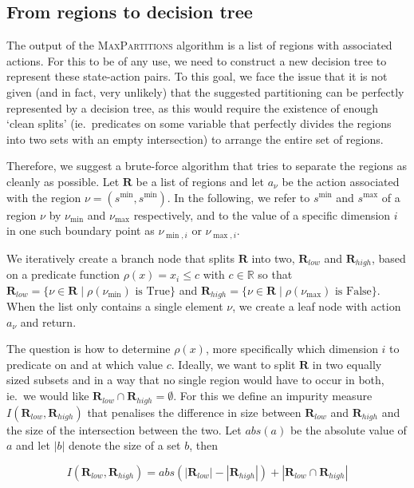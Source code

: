 \subsection{From regions to decision tree}%
\label{sub:regionsToDT}

The output of the \textsc{MaxPartitions} algorithm is a list of regions with
associated actions. For this to be of any use, we need to construct a new
decision tree to represent these state-action pairs. To this goal, we face the
issue that it is not given (and in fact, very unlikely) that the suggested
partitioning can be perfectly represented by a decision tree, as this would
require the existence of enough `clean splits' (ie.\ predicates on some variable
that perfectly divides the regions into two sets with an empty intersection) to
arrange the entire set of regions.

Therefore, we suggest a brute-force algorithm that tries to separate the regions
as cleanly as possible. Let $\mathbf{R}$ be a list of regions and let $a_{\nu}$
be the action associated with the region $\nu = (s^{\min}, s^{\min})$. In the
following, we refer to $s^{\min}$ and $s^{\max}$ of a region $\nu$ by
$\nu_{\min}$ and $\nu_{\max}$ respectively, and to the value of a specific
dimension $i$ in one such boundary point as $\nu_{\min, i}$ or $\nu_{\max,i}$.

We iteratively create a branch node that splits $\mathbf{R}$ into two,
$\mathbf{R}_{low}$ and $\mathbf{R}_{high}$, based on a predicate function
$\rho(x) = x_i \le c$ with $c \in \mathbb{R}$ so that $\mathbf{R}_{low} = \{ \nu
\in \mathbf{R} \mid \rho(\nu_{\min}) \text{~is True} \}$ and $\mathbf{R}_{high}
= \{ \nu \in \mathbf{R} \mid \rho(\nu_{\max}) \text{~is False} \}$. When the
list only contains a single element $\nu$, we create a leaf node with action
$a_{\nu}$ and return.

The question is how to determine $\rho(x)$, more specifically which dimension
$i$ to predicate on and at which value $c$. Ideally, we want to split
$\mathbf{R}$ in two equally sized subsets and in a way that no single region
would have to occur in both, ie.\ we would like $\mathbf{R}_{low} \cap
\mathbf{R}_{high} = \emptyset$. For this we define an impurity measure
$I(\mathbf{R}_{low},\mathbf{R}_{high})$ that penalises the difference in size
between $\mathbf{R}_{low}$ and $\mathbf{R}_{high}$ and the size of the
intersection between the two. Let $abs(a)$ be the absolute value of $a$ and let
$|b|$ denote the size of a set $b$, then

\[
    I(\mathbf{R}_{low}, \mathbf{R}_{high})  = abs(|\mathbf{R}_{low}| -
    |\mathbf{R}_{high}|) + |\mathbf{R}_{low} \cap \mathbf{R}_{high}|
\]


